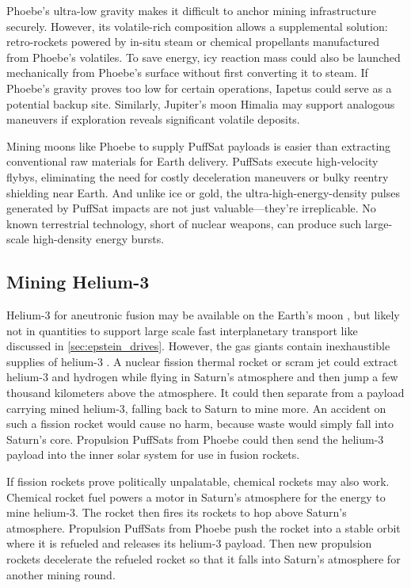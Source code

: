\documentclass{article}
\begin{document}
Phoebe’s ultra-low gravity makes it difficult to anchor mining infrastructure securely. However, its volatile-rich composition allows a supplemental solution: retro-rockets powered by in-situ steam or chemical propellants manufactured from Phoebe's volatiles. To save energy, icy reaction mass could also be launched mechanically from Phoebe’s surface without first converting it to steam. If Phoebe’s gravity proves too low for certain operations, Iapetus could serve as a potential backup site. Similarly, Jupiter’s moon Himalia may support analogous maneuvers if exploration reveals significant volatile deposits.

Mining moons like Phoebe to supply PuffSat payloads is easier than extracting conventional raw materials for Earth delivery. PuffSats execute high-velocity flybys, eliminating the need for costly deceleration maneuvers or bulky reentry shielding near Earth. And unlike ice or gold, the ultra-high-energy-density pulses generated by PuffSat impacts are not just valuable—they’re irreplicable. No known terrestrial technology, short of nuclear weapons, can produce such large-scale high-density energy bursts.

\subsection{Mining Helium-3} \label{sec:mining_helium_3}
Helium-3 for aneutronic fusion may be available on the Earth's moon \cite{esa_helium3_mining}, but likely not in quantities to support large scale fast interplanetary transport like discussed in \autoref{sec:epstein_drives}.   However, the gas giants contain inexhaustible supplies of helium-3 \cite{palaszewski2005atmospheric}.   A nuclear fission thermal rocket or scram jet could extract helium-3 and hydrogen while flying in Saturn's atmosphere and then jump a few thousand kilometers above the atmosphere.  It could then separate from a payload carrying mined helium-3, falling back to Saturn to mine more.  An accident on such a fission rocket would cause no harm, because waste would simply fall into Saturn's core. Propulsion PuffSats from Phoebe could then send the helium-3 payload into the inner solar system for use in fusion rockets.  

If fission rockets prove politically unpalatable, chemical rockets may also work.   Chemical rocket fuel powers a motor in Saturn's atmosphere for the energy to mine helium-3.  The rocket then fires its rockets to hop above Saturn's atmosphere.   Propulsion PuffSats from Phoebe push the rocket into a stable orbit where it is refueled and releases its helium-3 payload.  Then new propulsion rockets decelerate the refueled rocket so that it falls into Saturn's atmosphere for another mining round.
\end{document}
